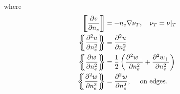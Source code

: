 where
\begin{align*}
    \jump{ \frac{\partial v}{\partial n_{e}} } &= - n_{e} \nabla \nu_{T} , \quad \nu _{T} = \nu |_{T}   \\
    \mean{ \frac{\partial ^2 u}{\partial n_{e}^2  } }  & = \frac{\partial ^2 u }{\partial n_{e} ^2 }  \\
    \mean{ \frac{\partial w}{\partial n^2_{e}} }  &=  \frac{1}{2} \left( \frac{\partial^2 w_{-} }{\partial n^2_{e} } +
    \frac{\partial ^2 w_{+}}{\partial n^2_{e} }   \right) \\
    \mean{ \frac{\partial ^2 w}{\partial n^2_{e} } } & = \frac{\partial ^2 w}{\partial n^2_{e}}, \quad \text{ on edges}
.\end{align*}





